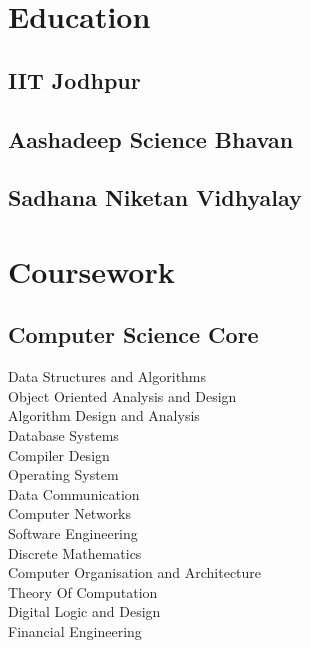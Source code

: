 \documentclass[a4paper]{deedy-resume-openfont}
\begin{document}
{}

\begin{minipage}[t]{0.36\textwidth}

\section{Education}

\subsection{IIT Jodhpur}
\sectionsep

\subsection{Aashadeep Science Bhavan}
\sectionsep

\subsection{Sadhana Niketan Vidhyalay}
\sectionsep

\section{Coursework}
\subsection{Computer Science Core}
Data Structures and Algorithms \\
Object Oriented Analysis and Design \\
Algorithm Design and Analysis \\
Database Systems \\
Compiler Design \\
Operating System \\
Data Communication \\
Computer Networks \\
Software Engineering \\
Discrete Mathematics \\
Computer Organisation and Architecture \\
Theory Of Computation \\ 
Digital Logic and Design \\
Financial Engineering \\
\sectionsep


\end{minipage}
\end{document}
